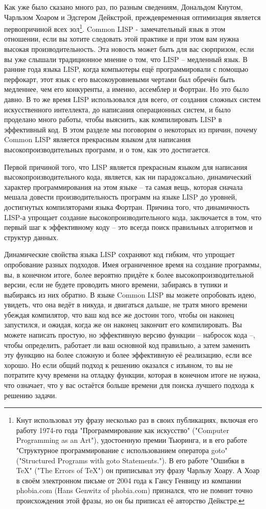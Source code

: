 Как уже было сказано много раз, по разным сведениям, Дональдом Кнутом, Чарльзом Хоаром и
Эдсгером Дейкстрой, преждевременная оптимизация является первопричиной всех
зол\footnote{Кнут использовал эту фразу несколько раз в своих публикациях, включая его
  работу 1974-го года "Программирование как искусство" ("Computer Programming as an Art"),
  удостоенную премии Тьюринга, и в его работе "Структурное программирование с
  использованием оператора goto" ("Structured Programs with goto Statements."). В его
  работе "Ошибки в TeX" ("The Errors of TeX") он приписывал эту фразу Чарльзу Хоару. А
  Хоар в своём электронном письме от 2004 года к Гансу Генвицу из компании phobia.com
  (Hans Genwitz of phobia.com) признался, что не помнит точно происхождения этой фразы, но
  он бы приписал её авторство Дейкстре.}. Common LISP - замечательный язык в этом
отношении, если вы хотите следовать этой практике и при этом вам нужна высокая
производительность. Эта новость может быть для вас сюрпризом, если вы уже слышали
традиционное мнение о том, что LISP -- медленный язык. В ранние года языка LISP, когда
компьютеры ещё программировали с помощью перфокарт, этот язык с его высокоуровневыми
чертами был обречён быть медленнее, чем его конкуренты, а именно, ассемблер и Фортран. Но
это было давно. В то же время LISP использовался для всего, от создания сложных систем
искусственного интеллекта, до написания операционных систем, и было проделано много
работы, чтобы выяснить, как компилировать LISP в эффективный код.  В этом разделе мы
поговорим о некоторых из причин, почему Common LISP является прекрасным языком для
написания высокопроизводительных программ, и о том, как это достигается.

Первой причиной того, что LISP является прекрасным языком для написания
высокопроизводительного кода, является, как ни парадоксально, динамический характер
программирования на этом языке -- та самая вещь, которая сначала мешала довести
производительность программ на языке LISP до уровней, достигнутых компиляторами языка
Фортран. Причина того, что динамичность LISP-а упрощает создание высокопроизводительного
кода, заключается в том, что первый шаг к эффективному коду -- это всегда поиск правильных
алгоритмов и структур данных.

Динамические свойства языка LISP сохраняют код гибким, что упрощает опробование разных
подходов. Имея ограниченное время на создание программы, вы, в конечном итоге, более
вероятно придёте к более высокопроизводительной версии, если не будете проводить много
времени, забираясь в тупики и выбираясь из них обратно. В языке Common LISP вы можете
опробовать идею, увидеть, что она ведёт в никуда, и двигаться дальше, не тратя много
времени убеждая компилятор, что ваш код все же достоин того, чтобы он наконец запустился,
и ожидая, когда же он наконец закончит его компилировать. Вы можете написать простую, но
эффективную версию функции -- набросок кода --, чтобы определить, работает ли ваш основной
код правильно, а затем заменить эту функцию на более сложную и более эффективную её
реализацию, если все хорошо. Но если общий подход к решению оказался с изъяном, то вы не
потратите кучу времени на отладку функции, которая в конечном итоге не нужна, что
означает, что у вас остаётся больше времени для поиска лучшего подхода к решению задачи.

